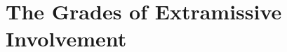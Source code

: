 \documentclass[12pt]{article}
\begin{document}
 


\section{The Grades of Extramissive Involvement} %
\label{sec:extramission}
\end{document}
